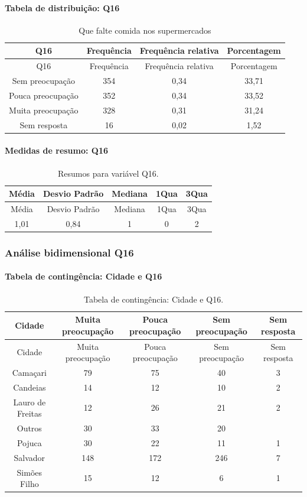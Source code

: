 \documentclass[]{article}
\let\oldparagraph\paragraph
\renewcommand{\paragraph}[1]{\oldparagraph{#1}\mbox{}}
\begin{document}
\hypertarget{tabela-de-distribuiuxe7uxe3o-q16}{%
\paragraph{Tabela de distribuição: Q16}\label{tabela-de-distribuiuxe7uxe3o-q16}}

\begin{longtable}[]{@{}cccc@{}}
\caption{\label{tab:unnamed-chunk-134}Que falte comida nos supermercados}\tabularnewline
\toprule
Q16 & Frequência & Frequência relativa & Porcentagem\tabularnewline
\midrule
\endfirsthead
\toprule
Q16 & Frequência & Frequência relativa & Porcentagem\tabularnewline
\midrule
\endhead
Sem preocupação & 354 & 0,34 & 33,71\tabularnewline
Pouca preocupação & 352 & 0,34 & 33,52\tabularnewline
Muita preocupação & 328 & 0,31 & 31,24\tabularnewline
Sem resposta & 16 & 0,02 & 1,52\tabularnewline
\bottomrule
\end{longtable}

\hypertarget{medidas-de-resumo-q16}{%
\paragraph{Medidas de resumo: Q16}\label{medidas-de-resumo-q16}}

\begin{longtable}[]{@{}ccccc@{}}
\caption{\label{tab:unnamed-chunk-135}Resumos para variável Q16.}\tabularnewline
\toprule
Média & Desvio Padrão & Mediana & 1Qua & 3Qua\tabularnewline
\midrule
\endfirsthead
\toprule
Média & Desvio Padrão & Mediana & 1Qua & 3Qua\tabularnewline
\midrule
\endhead
1,01 & 0,84 & 1 & 0 & 2\tabularnewline
\bottomrule
\end{longtable}

\cleardoublepage

\hypertarget{anuxe1lise-bidimensional-q16}{%
\subsubsection{Análise bidimensional Q16}\label{anuxe1lise-bidimensional-q16}}

\hypertarget{tabela-de-continguxeancia-cidade-e-q16}{%
\paragraph{Tabela de contingência: Cidade e Q16}\label{tabela-de-continguxeancia-cidade-e-q16}}

\begin{longtable}[]{@{}ccccc@{}}
\caption{\label{tab:unnamed-chunk-136}Tabela de contingência: Cidade e Q16.}\tabularnewline
\toprule
Cidade & Muita preocupação & Pouca preocupação & Sem preocupação & Sem resposta\tabularnewline
\midrule
\endfirsthead
\toprule
Cidade & Muita preocupação & Pouca preocupação & Sem preocupação & Sem resposta\tabularnewline
\midrule
\endhead
Camaçari & 79 & 75 & 40 & 3\tabularnewline
Candeias & 14 & 12 & 10 & 2\tabularnewline
Lauro de Freitas & 12 & 26 & 21 & 2\tabularnewline
Outros & 30 & 33 & 20 &\tabularnewline
Pojuca & 30 & 22 & 11 & 1\tabularnewline
Salvador & 148 & 172 & 246 & 7\tabularnewline
Simões Filho & 15 & 12 & 6 & 1\tabularnewline
\bottomrule
\end{longtable}
\end{document}
